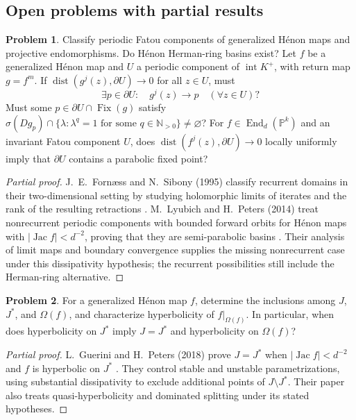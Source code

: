 \documentclass[11pt,reqno]{amsart}
\theoremstyle{definition}
\newtheorem{problem}{Problem}[section]
\theoremstyle{remark}
\begin{document}
\subsection{Open problems with partial results}

\begin{problem}\label{b95-10-2-2}\label{FS-2.9}
Classify periodic Fatou components of generalized H\'enon maps and projective endomorphisms. Do H\'enon Herman-ring basins exist? Let $f$ be a generalized H\'enon map and $U$ a periodic component of $\operatorname{int}K^+$, with return map $g=f^m$. If $\operatorname{dist}(g^j(z),\partial U)\to0$ for all $z\in U$, must
\[
 \exists p\in\partial U:\quad g^j(z)\to p\quad(\forall z\in U)?
\]
Must some $p\in\partial U\cap\operatorname{Fix}(g)$ satisfy $\sigma(Dg_p)\cap\{\lambda:\lambda^q=1\text{ for some }q\in\mathbb N_{>0}\}\ne\varnothing$? For $f\in\operatorname{End}_d(\mathbb P^k)$ and an invariant Fatou component $U$, does $\operatorname{dist}(f^j(z),\partial U)\to0$ locally uniformly imply that $\partial U$ contains a parabolic fixed point?
\end{problem}
\begin{proof}[Partial proof]
J.~E.~Forn\ae ss and N.~Sibony (1995) classify recurrent domains in their two-dimensional setting by studying holomorphic limits of iterates and the rank of the resulting retractions \cite{FS-Recurrent}. M.~Lyubich and H.~Peters (2014) treat nonrecurrent periodic components with bounded forward orbits for H\'enon maps with $|\operatorname{Jac}f|<d^{-2}$, proving that they are semi-parabolic basins \cite{B95-LP}. Their analysis of limit maps and boundary convergence supplies the missing nonrecurrent case under this dissipativity hypothesis; the recurrent possibilities still include the Herman-ring alternative.
\end{proof}

\begin{problem}\label{FS-2.4}
For a generalized H\'enon map $f$, determine the inclusions among $J$, $J^*$, and $\Omega(f)$, and characterize hyperbolicity of $f|_{\Omega(f)}$. In particular, when does hyperbolicity on $J^*$ imply $J=J^*$ and hyperbolicity on $\Omega(f)$?
\end{problem}
\begin{proof}[Partial proof]
L.~Guerini and H.~Peters (2018) prove $J=J^*$ when $|\operatorname{Jac}f|<d^{-2}$ and $f$ is hyperbolic on $J^*$ \cite{FS-GP}. They control stable and unstable parametrizations, using substantial dissipativity to exclude additional points of $J\setminus J^*$. Their paper also treats quasi-hyperbolicity and dominated splitting under its stated hypotheses.
\end{proof}
\end{document}
